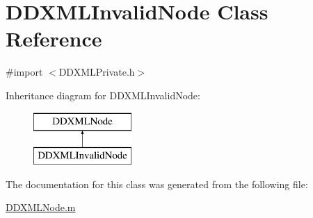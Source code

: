 \hypertarget{class_d_d_x_m_l_invalid_node}{
\section{DDXMLInvalidNode Class Reference}
\label{class_d_d_x_m_l_invalid_node}
}


{\ttfamily \#import $<$DDXMLPrivate.h$>$}

Inheritance diagram for DDXMLInvalidNode:\begin{figure}[H]
\begin{center}
\leavevmode
\includegraphics[height=2cm]{class_d_d_x_m_l_invalid_node}
\end{center}
\end{figure}


The documentation for this class was generated from the following file:\begin{DoxyCompactItemize}
\item 
\hyperlink{_d_d_x_m_l_node_8m}{DDXMLNode.m}\end{DoxyCompactItemize}
